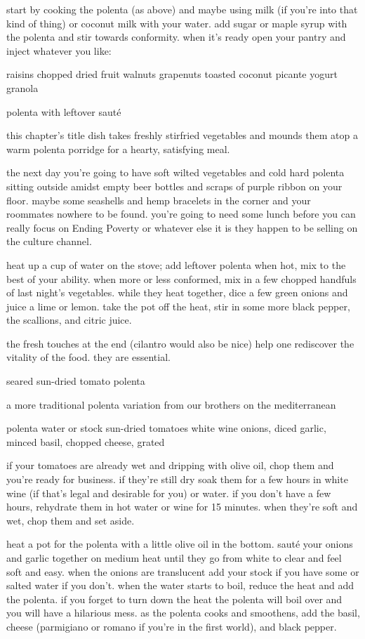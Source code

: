 start by cooking the polenta (as above) and maybe using milk (if you're into that kind of thing) or coconut milk with your water. add sugar or maple syrup with the polenta and stir towards conformity. when it's ready open your pantry and inject whatever you like:

	raisins
		chopped dried fruit
						walnuts
	grapenuts
			toasted coconut
					picante
		yogurt
			granola	

polenta with leftover saut\'{e}

this chapter's title dish takes freshly stirfried vegetables and mounds them atop a warm polenta porridge for a hearty, satisfying meal.

the next day you're going to have soft wilted vegetables and cold hard polenta sitting outside amidst empty beer bottles and scraps of purple ribbon on your floor. maybe some seashells and hemp bracelets in the corner and your roommates nowhere to be found. you're going to need some lunch before you can really focus on Ending Poverty or whatever else it is they happen to be selling on the culture channel.

heat up a cup of water on the stove; add leftover polenta when hot, mix to the best of your ability.
when more or less conformed, mix in a few chopped handfuls of last night's vegetables.
while they heat together, dice a few green onions and juice a lime or lemon.
take the pot off the heat, stir in some more black pepper, the scallions, and citric juice.

the fresh touches at the end (cilantro would also be nice) help one rediscover the vitality of the food. they are essential. 	

seared sun-dried tomato polenta

a more traditional polenta variation from our brothers on the mediterranean

polenta
water or stock
sun-dried tomatoes
white wine
onions, diced
garlic, minced
basil, chopped
cheese, grated

if your tomatoes are already wet and dripping with olive oil, chop them and you're ready for business. if they're still dry soak them for a few hours in white wine (if that's legal and desirable for you) or water. if you don't have a few hours, rehydrate them in hot water or wine for 15 minutes. when they're soft and wet, chop them and set aside.

heat a pot for the polenta with a little olive oil in the bottom. saut\'{e} your onions and garlic together on medium heat until they go from white to clear and feel soft and easy.
when the onions are translucent add your stock if you have some or salted water if you don't. when the water starts to boil, reduce the heat and add the polenta. if you forget to turn down the heat the polenta will boil over and you will have a hilarious mess. as the polenta cooks and smoothens, add the basil, cheese (parmigiano or romano if you're in the first world), and black pepper.

